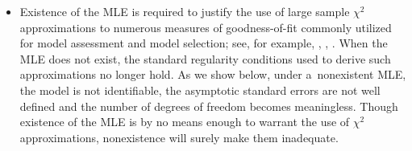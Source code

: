 \documentclass[aos,MSNbibl,nameyear,dvips]{arximspdf}
\begin{document}
\begin{itemize}
%
\item Existence of the MLE is required to justify the use of large
sample $\chi^2$ approximations to numerous measures of goodness-of-fit
commonly utilized for model assessment and model selection; see, for
example, \citet{BFH75}, \citet{AGR02}, \citet{CR88}. When the MLE does
not exist, the standard regularity conditions used to derive such
approximations no longer hold. As we show below, under a~nonexistent
MLE, the model is not identifiable, the asymptotic standard
errors are not well defined and the number of degrees of freedom
becomes meaningless. Though existence of the MLE is by no means enough
to warrant the use of $\chi^2$ approximations, nonexistence will surely
make them inadequate.


\end{itemize}
\end{document}
